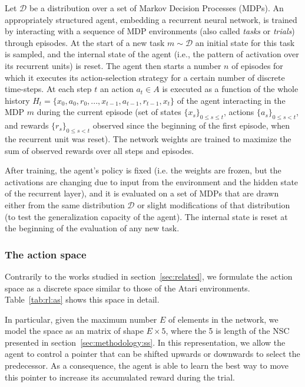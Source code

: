 Let $\mathcal{D}$ be a distribution over a set of Markov Decision Processes (MDPs). An appropriately structured agent, embedding a recurrent neural network, is trained by interacting with a sequence of MDP environments (also called \textit{tasks} or \textit{trials}) through episodes. At the start of a new task $m \sim \mathcal{D}$ an initial state for this task is sampled, and the internal state of the agent (i.e., the pattern of activation over its recurrent units) is reset. The agent then starts a number $n$ of episodes for which it executes its action-selection strategy for a certain number of discrete time-steps. At each step $t$ an action $a_t \in A$ is executed as a function of the whole history $H_t = \{x_0, a_0, r_0, . . . , x_{t-1}, a_{t-1}, r_{t-1}, x_t\}$ of the agent interacting in the MDP $m$ during the current episode (set of states $\{x_s\}_{0 \leq s \leq t}$, actions $\{a_s\}_{0 \leq s < t}$, and rewards $\{r_s\}_{0 \leq s < t}$ observed since the beginning of the first episode, when the recurrent unit was reset). The network weights are trained to maximize the sum of observed rewards over all steps and episodes.

After training, the agent's policy is fixed (i.e. the weights are frozen, but the activations are changing due to input from the environment and the hidden state of the recurrent layer), and it is evaluated on a set of MDPs that are drawn either from the same distribution $\mathcal{D}$ or slight modifications of that distribution (to test the generalization capacity of the agent). The internal state is reset at the beginning of the evaluation of any new task.


\subsubsection{The action space}\label{sec:methodology:rl:as}

Contrarily to the works studied in section~\ref{sec:related}, we formulate the action space as a discrete space similar to those of the Atari environments. Table~\ref{tab:rl:as} shows this space in detail. 

In particular, given the maximum number $E$ of elements in the network, we model the space as an matrix of shape $E \times 5$, where the 5 is length of the NSC presented in section~\ref{sec:methodology:ss}. In this representation, we allow the agent to control a pointer that can be shifted upwards or downwards to select the predecessor. As a consequence, the agent is able to learn the best way to move this pointer to increase its accumulated reward during the trial.


